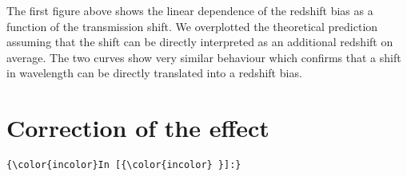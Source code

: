 \documentclass[11pt]{article}
\begin{document}
    \begin{center}
    \end{center}
    { \hspace*{\fill} \\}
    
    \begin{center}
    \end{center}
    { \hspace*{\fill} \\}
    
    \begin{center}
    \end{center}
    { \hspace*{\fill} \\}
    
    \begin{center}
    \end{center}
    { \hspace*{\fill} \\}
    
    \begin{center}
    \end{center}
    { \hspace*{\fill} \\}
    
    The first figure above shows the linear dependence of the redshift bias
as a function of the transmission shift. We overplotted the theoretical
prediction assuming that the shift can be directly interpreted as an
additional redshift on average. The two curves show very similar
behaviour which confirms that a shift in wavelength can be directly
translated into a redshift bias.

    \section{Correction of the effect}\label{correction-of-the-effect}

    \begin{Verbatim}[commandchars=\\\{\}]
{\color{incolor}In [{\color{incolor} }]:} 
\end{Verbatim}
\end{document}
